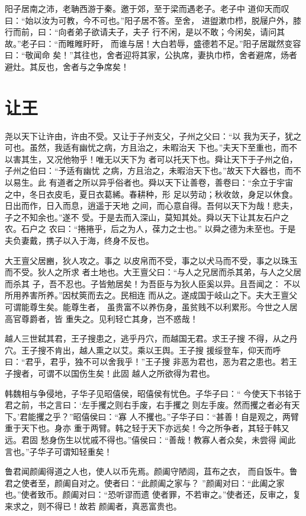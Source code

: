 \documentclass[12pt,UTF8]{ctexbook}
\begin{document}
阳子居南之沛，老聃西游于秦。邀于郊，至于梁而遇老子。老子中 道仰天而叹曰：“始以汝为可教，今不可也。”阳子居不答。至舍， 进盥漱巾栉，脱屦户外，膝行而前，曰：“向者弟子欲请夫子，夫子 行不闲，是以不敢；今闲矣，请问其故。”老子曰：“而睢睢盱盱， 而谁与居！大白若辱，盛德若不足。”阳子居蹴然变容曰：“敬闻命 矣！”其往也，舍者迎将其家，公执席，妻执巾栉，舍者避席，炀者 避灶。其反也，舍者与之争席矣！
\section{让王}

尧以天下让许由，许由不受。又让于子州支父，子州之父曰：“以 我为天子，犹之可也。虽然，我适有幽忧之病，方且治之，未暇治天 下也。”夫天下至重也，而不以害其生，又况他物乎！唯无以天下为 者可以托天下也。舜让天下于子州之伯，子州之伯曰：“予适有幽忧 之病，方且治之，未暇治天下也。”故天下大器也，而不以易生。此 有道者之所以异乎俗者也。舜以天下让善卷，善卷曰：“余立于宇宙 之中，冬日衣皮毛，夏日衣葛絺。春耕种，形 足以劳动；秋收敛，身足以休食。日出而作，日入而息，逍遥于天地 之间，而心意自得。吾何以天下为哉！悲夫，子之不知余也。”遂不 受。于是去而入深山，莫知其处。舜以天下让其友石户之农。石户之 农曰：“捲捲乎，后之为人，葆力之士也。” 以舜之德为未至也。于是夫负妻戴，携子以入于海，终身不反也。

大王亶父居豳，狄人攻之。事之 以皮帛而不受，事之以犬马而不受，事之以珠玉而不受。狄人之所求 者土地也。大王亶父曰：“与人之兄居而杀其弟，与人之父居而杀其 子，吾不忍也。子皆勉居矣！为吾臣与为狄人臣奚以异。且吾闻之： 不以所用养害所养。”因杖筴而去之。民相连 而从之。遂成国于岐山之下。夫大王亶父可谓能尊生矣。能尊生者， 虽贵富不以养伤身，虽贫贱不以利累形。今世之人居高官尊爵者，皆 重失之。见利轻亡其身，岂不惑哉！

越人三世弑其君，王子搜患之，逃乎丹穴，而越国无君。求王子搜 不得，从之丹穴。王子搜不肯出，越人熏之以艾。乘以王舆。王子搜 援绥登车，仰天而呼曰：“君乎，君乎，独不可以舍我乎！”王子搜 非恶为君也，恶为君之患也。若王子搜者，可谓不以国伤生矣！此固 越人之所欲得为君也。

韩魏相与争侵地，子华子见昭僖侯，昭僖侯有忧色。子华子曰：“ 今使天下书铭于君之前，书之言曰：‘左手攫之则右手废，右手攫之 则左手废。然而攫之者必有天下。’君能攫之乎？”昭僖侯曰：“寡 人不攫也。”子华子曰：“甚善！自是观之，两臂重于天下也。身亦 重于两臂。韩之轻于天下亦远矣！今之所争者，其轻于韩又远。君固 愁身伤生以忧戚不得也。”僖侯曰：“善哉！教寡人者众矣，未尝得 闻此言也。”子华子可谓知轻重矣！

鲁君闻颜阖得道之人也，使人以币先焉。颜阖守陋闾，苴布之衣， 而自饭牛。鲁君之使者至，颜阖自对之。使者曰：“此颜阖之家与？ ”颜阖对曰：“此阖之家也。”使者致币。颜阖对曰：“恐听谬而遗 使者罪，不若审之。”使者还，反审之，复来求之，则不得已！故若 颜阖者，真恶富贵也。
\end{document}
